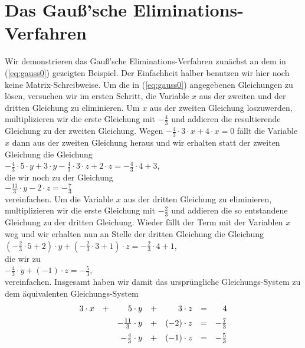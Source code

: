 \section{Das Gauß'sche Eliminations-Verfahren}
Wir demonstrieren das Gauß'sche Eliminations-Verfahren zunächst an dem in (\ref{eq:gauss0}) gezeigten
Beispiel.  Der Einfachheit halber benutzen wir hier noch keine Matrix-Schreibweise.
Um die in (\ref{eq:gauss0}) angegebenen Gleichungen zu lösen, versuchen wir im ersten Schritt, die
Variable $x$ aus der zweiten und der dritten Gleichung zu eliminieren.  Um $x$ aus der zweiten Gleichung
loszuwerden, multiplizieren wir die erste Gleichung mit $-\frac{4}{3}$ und addieren die resultierende
Gleichung zu der zweiten Gleichung.  Wegen $-\frac{4}{3} \cdot 3 \cdot x + 4 \cdot x = 0$ fällt die
Variable $x$ dann aus der zweiten Gleichung heraus und wir erhalten statt der zweiten Gleichung die Gleichung
\\[0.2cm]
\hspace*{1.3cm}
$-\frac{4}{3} \cdot 5 \cdot y + 3 \cdot y -\frac{4}{3} \cdot 3 \cdot z + 2 \cdot z = -\frac{4}{3} \cdot 4 + 3$,
\\[0.2cm]
die wir noch zu der Gleichung
\\[0.2cm]
\hspace*{1.3cm}
$-\frac{11}{3} \cdot y - 2 \cdot z = -\frac{7}{3}$
\\[0.2cm]
vereinfachen.  Um die Variable $x$ aus der dritten Gleichung zu eliminieren, multiplizieren wir die
erste Gleichung mit $-\frac{2}{3}$ und addieren die so entstandene Gleichung zu der dritten Gleichung.  
Wieder fällt der Term mit der Variablen $x$ weg und wir erhalten nun an Stelle der dritten Gleichung die
Gleichung 
\\[0.2cm]
\hspace*{1.3cm}
$(-\frac{2}{3} \cdot 5 + 2) \cdot y + (-\frac{2}{3} \cdot 3 + 1) \cdot z = -\frac{2}{3} \cdot 4 + 1$,
\\[0.2cm]
die wir zu
\\[0.2cm]
\hspace*{1.3cm}
$-\frac{4}{3} \cdot y + (-1) \cdot z = -\frac{5}{3}$,
\\[0.2cm]
vereinfachen.  Insgesamt haben wir damit das ursprüngliche Gleichungs-System zu dem äquivalenten
Gleichungs-System 
\begin{equation}
  \label{eq:gauss1} 
\begin{array}[c]{rcrcrcr}
  3 \cdot x & + & 5 \cdot y             & + &    3 \cdot z & = &           4  \\[0.2cm]
            &   & -\frac{11}{3} \cdot y & + & (-2) \cdot z & = & -\frac{7}{3} \\[0.2cm]
            &   & -\frac{4}{3}  \cdot y & + & (-1) \cdot z & = & -\frac{5}{3}
\end{array}
\end{equation}
